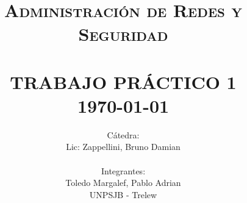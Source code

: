 \title{ \normalsize \textsc{Administración de Redes y Seguridad}
        \\ [2.0cm]
        \HRule{0.5pt} \\
        \LARGE \textbf{\uppercase{Trabajo Práctico 1}}
        \HRule{2pt} \\ [0.5cm]
        \normalsize \today \vspace*{5\baselineskip}}

\date{}

\author{
        Cátedra: \\
        Lic: Zappellini, Bruno Damian \\
\\
        Integrantes: \\
        Toledo Margalef, Pablo Adrian \\
        UNPSJB - Trelew}

\maketitle

